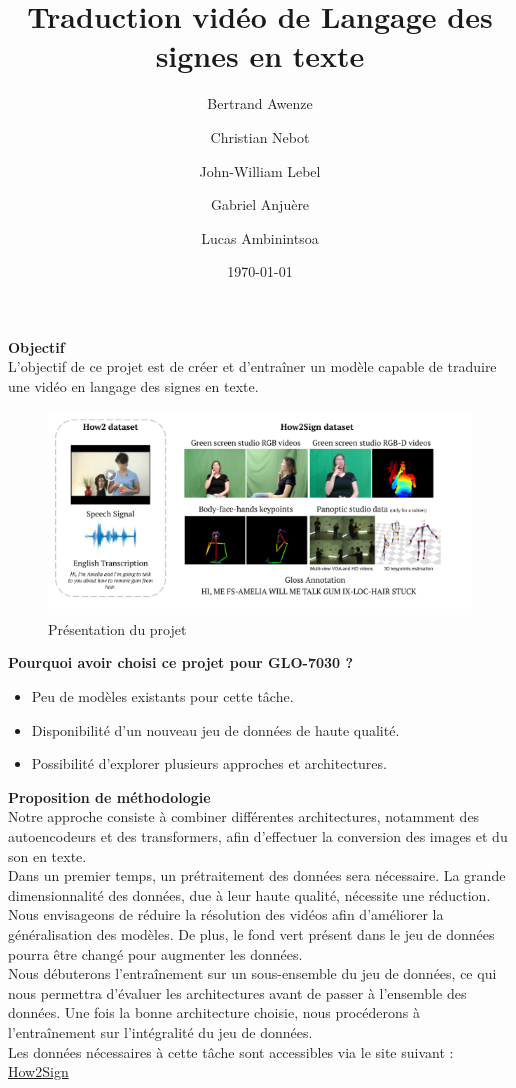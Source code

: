 \documentclass{article}
\title{\textbf{Traduction vidéo de Langage des signes en texte}}
\author{
    Bertrand Awenze \and
    Christian Nebot \and
    John-William Lebel \and
    Gabriel Anjuère\and
    Lucas Ambinintsoa
}
\date{\today}
\begin{document}
\maketitle

\noindent
\textbf{Objectif} \\

L’objectif de ce projet est de créer et d’entraîner un modèle capable de traduire une vidéo en langage des signes en texte.\\ 

\begin{figure}[h]
    \centering
    \includegraphics[width=1\textwidth]{img/image.png}
    \caption{Présentation du projet}
\end{figure}

\noindent
\textbf{Pourquoi avoir choisi ce projet pour GLO-7030 ?} \\
\begin{itemize}
    \item Peu de modèles existants pour cette tâche.
    \item Disponibilité d’un nouveau jeu de données de haute qualité.
    \item Possibilité d’explorer plusieurs approches et architectures.
\end{itemize}

\noindent
\textbf{Proposition de méthodologie} \\

Notre approche consiste à combiner différentes architectures, notamment des autoencodeurs et des transformers, afin d’effectuer la conversion des images et du son en texte. \\

Dans un premier temps, un prétraitement des données sera nécessaire. La grande dimensionnalité des données, due à leur haute qualité, nécessite une réduction. Nous envisageons de réduire la résolution des vidéos afin d’améliorer la généralisation des modèles. 
De plus, le fond vert présent dans le jeu de données pourra être changé pour augmenter les données. \\

Nous débuterons l’entraînement sur un sous-ensemble du jeu de données, ce qui nous permettra d'évaluer les architectures avant de passer à l’ensemble des données. 
Une fois la bonne architecture choisie, nous procéderons à l’entraînement sur l’intégralité du jeu de données.\\

Les données nécessaires à cette tâche sont accessibles via le site suivant :  
\href{https://how2sign.github.io/}{How2Sign}
\end{document}
